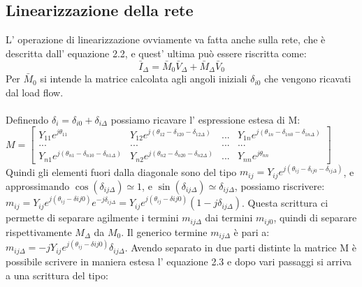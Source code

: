 \documentclass[Lau,noexaminfo]{sapthesis}
\begin{document}
	\subsection{Linearizzazione della rete}
	L' operazione di linearizzazione ovviamente va fatta anche sulla rete, che è descritta dall' equazione 2.2, e quest' ultima può essere riscritta come:\\
	\begin{equation}
	\bar{I}_\Delta=\bar{M}_0\bar{V}_\Delta+\bar{M}_\Delta\bar{V}_0
	\end{equation}
	Per $\bar{M}_0$ si intende la matrice calcolata agli angoli iniziali $\delta_{i0}$ che vengono ricavati dal load flow.\\\\ Definendo $\delta_i=\delta_{i0}+\delta_{i\Delta}$ possiamo ricavare l' espressione estesa di M:\\
	$M=\begin{bmatrix}
	Y_{11}e^{j\theta_{11}} & Y_{12}e^{j(\theta_{12}-\delta_{120}-\delta_{12\Delta})} & ... & Y_{1n}e^{j(\theta_{1n}-\delta_{1n0}-\delta_{1n\Delta})}\\
	... & ... & ... & ...\\
	Y_{n1}e^{j(\theta_{n1}-\delta_{n10}-\delta_{n1\Delta})} & Y_{n2}e^{j(\theta_{n2}-\delta_{n20}-\delta_{n2\Delta})} & ... & Y_{nn}e^{j\theta_{nn}}
	\end{bmatrix}$\\
	Quindi gli elementi fuori dalla diagonale sono del tipo $m_{ij}=Y_{ij}e^{j(\theta_{ij}-\delta_{ij0}-\delta_{ij\Delta})}$, e approssimando $\cos(\delta_{ij\Delta})\simeq 1$, e $\sin(\delta_{ij\Delta})\simeq \delta_{ij\Delta}$, possiamo riscrivere:\\
	$m_{ij}=Y_{ij}e^{j(\theta_{ij}-\delta{ij0})}e^{-j\delta_{ij\Delta}}=Y_{ij}e^{j(\theta_{ij}-\delta{ij0})}(1-j\delta_{ij\Delta})$. Questa scrittura ci permette di separare agilmente i termini $m_{ij\Delta}$ dai termini $m_{ij0}$, quindi di separare rispettivamente $M_\Delta$ da $M_0$. Il generico termine $m_{ij\Delta}$ è pari a:\\ $m_{ij\Delta}=-jY_{ij}e^{j(\theta_{ij}-\delta{ij0})}\delta_{ij\Delta}$. Avendo separato in due parti distinte la matrice M è possibile scrivere in maniera estesa l' equazione 2.3 e dopo vari passaggi si arriva a una scrittura del tipo:\\
\end{document}
